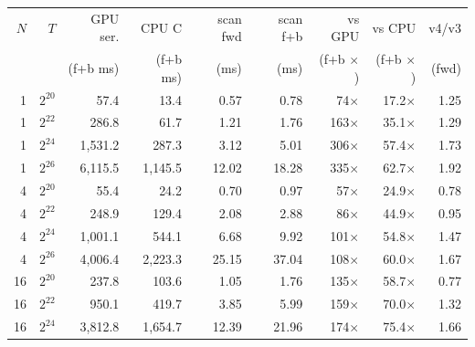 \begin{tabular}{rrrrrrrrr}
\toprule
$N$ & $T$ & GPU ser. & CPU C & scan fwd & scan f+b & vs GPU & vs CPU & v4/v3\\
 & & (f+b ms) & (f+b ms) & (ms) & (ms) & (f+b $\times$) & (f+b $\times$) & (fwd)\\
\midrule
1 & $2^{20}$ & 57.4 & 13.4 & 0.57 & 0.78 & 74$\times$ & 17.2$\times$ & 1.25\\
1 & $2^{22}$ & 286.8 & 61.7 & 1.21 & 1.76 & 163$\times$ & 35.1$\times$ & 1.29\\
1 & $2^{24}$ & 1{,}531.2 & 287.3 & 3.12 & 5.01 & 306$\times$ & 57.4$\times$ & 1.73\\
1 & $2^{26}$ & 6{,}115.5 & 1{,}145.5 & 12.02 & 18.28 & 335$\times$ & 62.7$\times$ & 1.92\\
4 & $2^{20}$ & 55.4 & 24.2 & 0.70 & 0.97 & 57$\times$ & 24.9$\times$ & 0.78\\
4 & $2^{22}$ & 248.9 & 129.4 & 2.08 & 2.88 & 86$\times$ & 44.9$\times$ & 0.95\\
4 & $2^{24}$ & 1{,}001.1 & 544.1 & 6.68 & 9.92 & 101$\times$ & 54.8$\times$ & 1.47\\
4 & $2^{26}$ & 4{,}006.4 & 2{,}223.3 & 25.15 & 37.04 & 108$\times$ & 60.0$\times$ & 1.67\\
16 & $2^{20}$ & 237.8 & 103.6 & 1.05 & 1.76 & 135$\times$ & 58.7$\times$ & 0.77\\
16 & $2^{22}$ & 950.1 & 419.7 & 3.85 & 5.99 & 159$\times$ & 70.0$\times$ & 1.32\\
16 & $2^{24}$ & 3{,}812.8 & 1{,}654.7 & 12.39 & 21.96 & 174$\times$ & 75.4$\times$ & 1.66\\
\bottomrule
\end{tabular}
